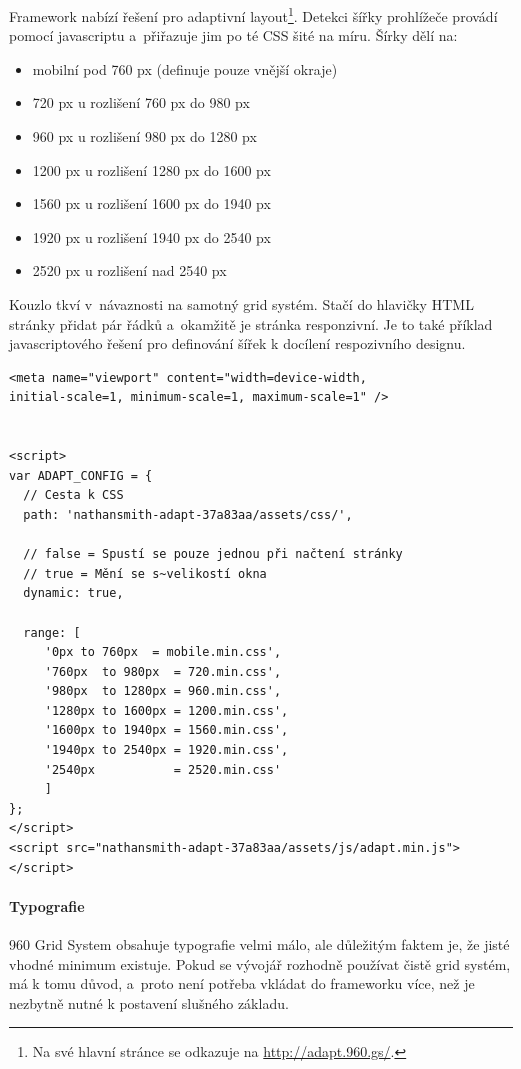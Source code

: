 \documentclass[thesis=B,czech]{FITthesis}[2012/06/26]
\begin{document}
Framework nabízí řešení pro adaptivní layout\footnote{Na své hlavní stránce se odkazuje na \url{http://adapt.960.gs/}.}. Detekci šířky prohlížeče provádí pomocí javascriptu a~přiřazuje jim po té \gls{CSS} šité na míru. Šírky dělí na:

\begin{itemize}
 \item mobilní pod 760 px
(definuje pouze vnější okraje)
 \item 720 px u rozlišení 760 px do 980 px
 \item 960 px u rozlišení 980 px do 1280 px
 \item 1200 px u rozlišení 1280 px do 1600 px
 \item 1560 px u rozlišení 1600 px do 1940 px
 \item 1920 px u rozlišení 1940 px do 2540 px
 \item 2520 px u rozlišení nad 2540 px 
\end{itemize}

Kouzlo tkví v~návaznosti na samotný grid  systém. Stačí do hlavičky \gls{HTML} stránky přidat pár řádků a~okamžitě je stránka responzivní. Je to také příklad javascriptového řešení pro definování šířek k docílení respozivního designu.
\scriptsize
\begin{verbatim}
<meta name="viewport" content="width=device-width, 
initial-scale=1, minimum-scale=1, maximum-scale=1" />


<script>
var ADAPT_CONFIG = {
  // Cesta k CSS
  path: 'nathansmith-adapt-37a83aa/assets/css/',
  
  // false = Spustí se pouze jednou při načtení stránky
  // true = Mění se s~velikostí okna
  dynamic: true,
  
  range: [
     '0px to 760px  = mobile.min.css',
     '760px  to 980px  = 720.min.css',
     '980px  to 1280px = 960.min.css',
     '1280px to 1600px = 1200.min.css',
     '1600px to 1940px = 1560.min.css',
     '1940px to 2540px = 1920.min.css',
     '2540px           = 2520.min.css'
     ]
};
</script>
<script src="nathansmith-adapt-37a83aa/assets/js/adapt.min.js"></script>
\end{verbatim}
\normalsize


\paragraph{Typografie}

960 Grid System obsahuje typografie velmi málo, ale důležitým faktem je, že jisté vhodné minimum existuje. Pokud se vývojář rozhodně používat čistě grid  systém, má k tomu důvod, a~proto není potřeba vkládat do frameworku více, než je nezbytně nutné k postavení slušného základu.
\end{document}
